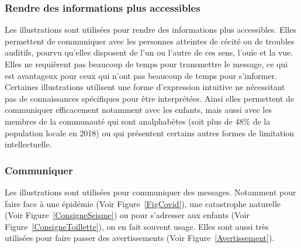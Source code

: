 \subsubsection{Rendre des informations plus accessibles}
Les illustrations sont utilis\'ees pour rendre des informations plus accessibles. Elles permettent de communiquer avec les personnes atteintes de c\'ecit\'e ou de troubles auditifs, pourvu qu'elles disposent de l'un ou l'autre de ces sens, l'ou\"ie et la vue. Elles ne requi\`erent pas beaucoup de temps pour transmettre le message, ce qui est avantageux pour ceux qui n'ont pas beaucoup de temps pour s'informer. Certaines illustrations utilisent une forme d'expression intuitive ne n\'ecessitant pas de connaissances sp\'ecifiques pour \^etre interpr\'et\'ees. Ainsi elles permettent de communiquer efficacement notamment avec les enfants, mais aussi avec les membres de la communaut\'e qui sont analphab\`etes (soit plus de 48\% de la population locale  en 2018\cite{AnalphabetismeHaiti}) ou qui pr\'esentent certains autres formes de limitation intellectuelle.

\subsubsection{Communiquer}
Les illustrations sont utilis\'ees pour communiquer des messages. Notamment pour faire face \`a une \'epid\'emie (Voir Figure~\ref{FigCovid}), une catastrophe naturelle (Voir Figure~\ref{ConsigneSeisme}) ou pour s'adresser aux enfants (Voir Figure~\ref{ConsigneToillette}), on en fait souvent usage. Elles sont aussi tr\`es utilis\'ees pour faire passer des avertissements (Voir Figure~\ref{Avertissement}).

